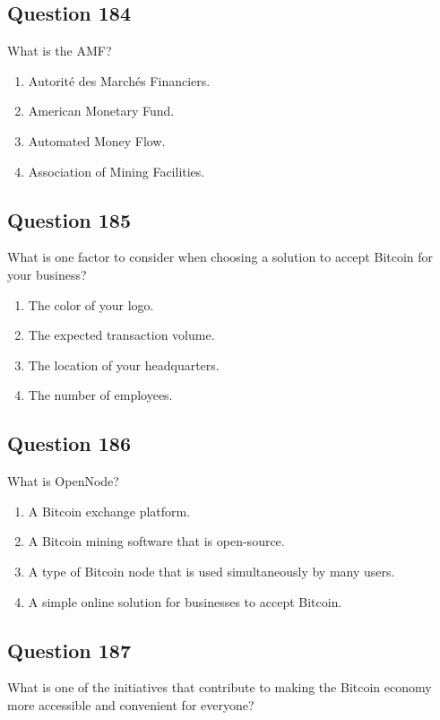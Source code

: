 \documentclass[12pt,a4paper]{article}
\begin{document}
\subsection*{Question 184}
What is the AMF?

\begin{enumerate}[label=\Alph*., leftmargin=*]
\item Autorité des Marchés Financiers.
\item American Monetary Fund.
\item Automated Money Flow.
\item Association of Mining Facilities.
\end{enumerate}

\bigskip


\subsection*{Question 185}
What is one factor to consider when choosing a solution to accept Bitcoin for your business?

\begin{enumerate}[label=\Alph*., leftmargin=*]
\item The color of your logo.
\item The expected transaction volume.
\item The location of your headquarters.
\item The number of employees.
\end{enumerate}

\bigskip


\subsection*{Question 186}
What is OpenNode?

\begin{enumerate}[label=\Alph*., leftmargin=*]
\item A Bitcoin exchange platform.
\item A Bitcoin mining software that is open-source.
\item A type of Bitcoin node that is used simultaneously by many users.
\item A simple online solution for businesses to accept Bitcoin.
\end{enumerate}

\bigskip


\subsection*{Question 187}
What is one of the initiatives that contribute to making the Bitcoin economy more accessible and convenient for everyone?
\end{document}
